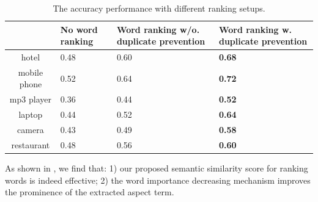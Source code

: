 \begin{table}[t]
	\centering
	\caption{The accuracy performance with different ranking setups.}
	\label{table:rankingeffect}
	\begin{tabular}{|c|C{1.5cm}|C{1.5cm}|C{1.5cm}|}
		\hline
		 & No word ranking & Word ranking w/o. duplicate prevention & Word ranking w. duplicate prevention \\ \hline
		hotel &0.48 &0.60 & \textbf{0.68} \\ \hline
		mobile phone &0.52 &0.64 & \textbf{0.72} \\ \hline
		mp3 player &0.36 & 0.44 & \textbf{0.52} \\ \hline
		laptop & 0.44 &0.52 & \textbf{0.64} \\ \hline
		camera & 0.43 &0.49 & \textbf{0.58} \\ \hline
		restaurant &0.48 &0.56 & \textbf{0.60} \\ \hline	
	\end{tabular}
\end{table}


As shown in ,
we find that: 1) our proposed semantic similarity score for ranking words is indeed effective; 2) the word importance decreasing mechanism improves the prominence of the extracted aspect term.

